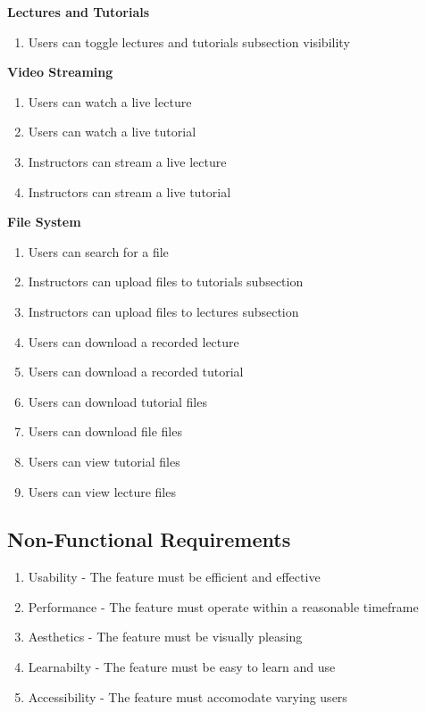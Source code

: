 \textbf{Lectures and Tutorials}
    \begin{enumerate}
    \item Users can toggle lectures and tutorials subsection visibility
    \end{enumerate}

\textbf{Video Streaming}
    \begin{enumerate}
    \item Users can watch a live lecture
    \item Users can watch a live tutorial
    \item Instructors can stream a live lecture
    \item Instructors can stream a live tutorial
    \end{enumerate}

\textbf{File System}
    \begin{enumerate}
    \item Users can search for a file
    \item Instructors can upload files to tutorials subsection
    \item Instructors can upload files to lectures subsection
    \item Users can download a recorded lecture
    \item Users can download a recorded tutorial
    \item Users can download tutorial files
    \item Users can download file files
    \item Users can view tutorial files
    \item Users can view lecture files
    \end{enumerate}

\subsection{Non-Functional Requirements}
  \begin{enumerate}
    \item Usability - The feature must be efficient and effective
    \item Performance - The feature must operate within a reasonable timeframe
    \item Aesthetics - The feature must be visually pleasing
    \item Learnabilty - The feature must be easy to learn and use
    \item Accessibility - The feature must accomodate varying users
    \end{enumerate}

